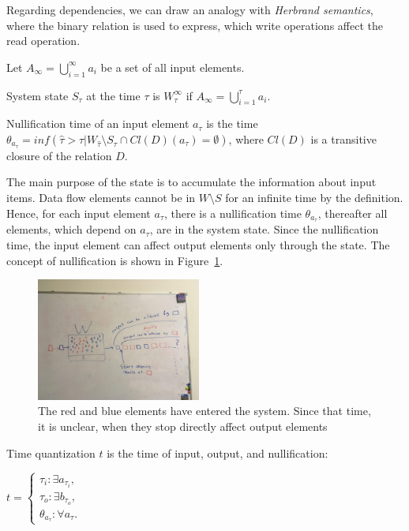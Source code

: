 Regarding dependencies, we can draw an analogy with {\em Herbrand semantics}, where the binary relation is used to express, which write operations affect the read operation.

Let $A_{\infty}=\bigcup\limits_{i=1}^{\infty}{a_i}$ be a set of all input elements.

\begin{definition}{System state}
$S_\tau$ at the time $\tau$ is $W_\tau^{\infty}$ if $A_{\infty}=\bigcup\limits_{i=1}^{\tau}{a_i}$.
\end{definition}

\begin{definition}{Nullification time}
of an input element $a_\tau$ is the time $\theta_{a_\tau}=inf(\hat{\tau}>\tau|W_{\hat{\tau}}\setminus{S_{\hat{\tau}}}\cap{Cl(D)(a_\tau)=\emptyset})$, where $Cl(D)$ is a transitive closure of the relation $D$.
\end{definition}

The main purpose of the state is to accumulate the information about input items. Data flow elements cannot be in $W\setminus{S}$ for an infinite time by the definition. Hence, for each input element $a_\tau$, there is a nullification time $\theta_{a_\tau}$, thereafter all elements, which depend on $a_\tau$, are in the system state. Since the nullification time, the input element can affect output elements only through the state. The concept of nullification is shown in Figure~\ref{nullification}. 

\begin{figure}[htbp]
  \centering
  \includegraphics[width=0.48\textwidth]{pics/nullification}
  \caption{The red and blue elements have entered the system. Since that time, it is unclear, when they stop directly affect output elements}
  \label {nullification}
\end{figure}

\begin{definition}{Time quantization}
$t$ is the time of input, output, and nullification:

$t=\begin{cases}
\tau_i:\exists{a_{\tau_i}}, \\
\tau_o:\exists{b_{\tau_o}}, \\
\theta_{a_\tau}:\forall{a_\tau}.
\end{cases}$
\end{definition}

